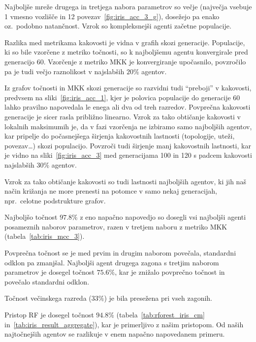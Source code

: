 \documentclass[a4paper,12pt,openright]{book}
\begin{document}
    Najboljše mreže drugega in tretjega nabora parametrov so večje (največja vsebuje 1 vmesno vozlišče in 12 povezav~\ref{fig:iris_acc_3_g}),
    dosežejo pa enako oz.\ podobno natančnost.
    Vzrok so kompleksnejši agenti začetne populacije.

    Razlika med metrikama kakovosti je vidna v grafih skozi generacije.
    Populacije, ki so bile vzorčene z metriko točnosti, so k najboljšemu agentu konvergirale pred generacijo 60.
    Vzorčenje z metriko MKK je konvergiranje upočasnilo, povzročilo pa je tudi večjo raznolikost v najslabših $20\%$ agentov.

    Iz grafov točnosti in MKK skozi generacije so razvidni tudi \enquote{preboji} v kakovosti, predvsem na sliki~\ref{fig:iris_acc_1},
    kjer je polovica populacije do generacije 60 lahko pravilno napovedala le enega ali dva od treh razredov.
    Povprečna kakovosti generacije je sicer rasla približno linearno.
    Vzrok za tako obtičanje kakovosti v lokalnih maksimumih je, da v fazi vzorčenja ne izbiramo samo najboljših agentov,
    kar pripelje do počasnejšega širjenja kakovostnih lastnosti (topologije, uteži, povezav\ldots) skozi populacijo.
    Povzroči tudi širjenje manj kakovostnih lastnosti, kar je vidno na sliki~\ref{fig:iris_acc_3} med generacijama 100 in
    120 s padcem kakovosti najslabših $30\%$ agentov.

    Vzrok za tako obtičanje kakovosti so tudi lastnosti najboljših agentov, ki jih naš način križanja ne more prenesti
    na potomce v samo nekaj generacijah, npr.\ celotne podstrukture grafov.

    Najboljšo točnost $97.8\%$ z eno napačno napovedjo so dosegli vsi najboljši agenti posameznih naborov parametrov, razen v tretjem naboru z
    metriko MKK (tabela~\ref{tab:iris_mcc_3}).

    Povprečna točnost se je med prvim in drugim naborom povečala, standardni odklon pa zmanjšal.
    Najboljši agent drugega zagona s tretjim naborom parametrov je dosegel točnost $75.6\%$, kar je znižalo povprečno točnost
    in povečalo standardni odklon.

    Točnost večinskega razreda ($33\%$) je bila presežena pri vseh zagonih.

    Pristop RF je dosegel točnost $94.8\%$ (tabela~\ref{tab:rforest_iris_cm} in~\ref{tab:iris_result_aggregate}), kar je
    primerljivo z našim pristopom.
    Od naših najtočnejših agentov se razlikuje v enem napačno napovedanem primeru.
\end{document}
